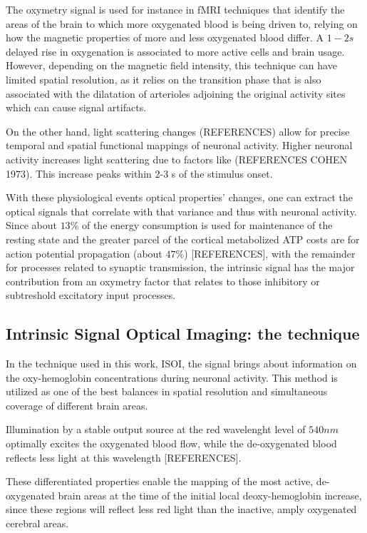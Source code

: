 The oxymetry signal is used for instance in fMRI techniques that identify the areas of the brain to which more oxygenated blood is being driven to, relying on how the magnetic properties of more and less oxygenated blood differ. A $1-2s$ delayed rise in oxygenation is associated to more active cells and brain usage. However, depending on the magnetic field intensity, this technique can have limited spatial resolution, as it relies on the transition phase that is also associated with the dilatation of arterioles adjoining the original activity sites which can cause signal artifacts.

On the other hand, light scattering changes (REFERENCES) allow for precise temporal and spatial functional mappings of neuronal activity. Higher neuronal activity increases light scattering due to factors like (REFERENCES COHEN 1973). This increase peaks within 2-3 s of the stimulus onset.

With these physiological events optical properties' changes, one can extract the optical signals that correlate with that variance and thus with neuronal activity. Since about $13\%$ of the energy consumption is used for maintenance of the resting state and the greater parcel of the cortical metabolized ATP costs are for action potential propagation (about $47\%$) [REFERENCES], with the remainder for processes related to synaptic transmission, the intrinsic signal has the major contribution from an oxymetry factor that relates to those inhibitory or subtreshold excitatory input processes.

\subsection{Intrinsic Signal Optical Imaging: the technique}

In the technique used in this work, ISOI, the signal brings about information on the oxy-hemoglobin concentrations during neuronal activity. This method is utilized as one of the best balances in spatial resolution and simultaneous coverage of different brain areas.

Illumination by a stable output source at the red wavelenght level of $540 nm$ optimally excites the oxygenated blood flow, while the de-oxygenated blood reflects less light at this wavelength [REFERENCES]. 

These differentiated properties enable the mapping of the most active, de-oxygenated brain areas at the time of the initial local deoxy-hemoglobin increase, since these regions will reflect less red light than the inactive, amply oxygenated cerebral areas.

